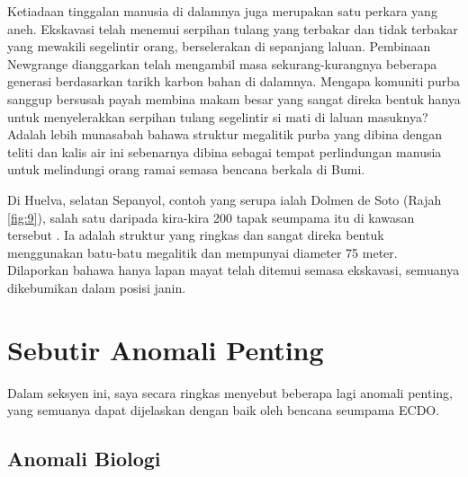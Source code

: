 \documentclass[10pt,twocolumn,letterpaper]{article}
\begin{document}
Ketiadaan tinggalan manusia di dalamnya juga merupakan satu perkara yang aneh. Ekskavasi telah menemui serpihan tulang yang terbakar dan tidak terbakar yang mewakili segelintir orang, berselerakan di sepanjang laluan. Pembinaan Newgrange dianggarkan telah mengambil masa sekurang-kurangnya beberapa generasi berdasarkan tarikh karbon bahan di dalamnya. Mengapa komuniti purba sanggup bersusah payah membina makam besar yang sangat direka bentuk hanya untuk menyelerakkan serpihan tulang segelintir si mati di laluan masuknya? Adalah lebih munasabah bahawa struktur megalitik purba yang dibina dengan teliti dan kalis air ini sebenarnya dibina sebagai tempat perlindungan manusia untuk melindungi orang ramai semasa bencana berkala di Bumi.

Di Huelva, selatan Sepanyol, contoh yang serupa ialah Dolmen de Soto (Rajah \ref{fig:9}), salah satu daripada kira-kira 200 tapak seumpama itu di kawasan tersebut \cite{72,32}. Ia adalah struktur yang ringkas dan sangat direka bentuk menggunakan batu-batu megalitik dan mempunyai diameter 75 meter. Dilaporkan bahawa hanya lapan mayat telah ditemui semasa ekskavasi, semuanya dikebumikan dalam posisi janin.

\section{Sebutir Anomali Penting}

Dalam seksyen ini, saya secara ringkas menyebut beberapa lagi anomali penting, yang semuanya dapat dijelaskan dengan baik oleh bencana seumpama ECDO.

\subsection{Anomali Biologi}
\end{document}
